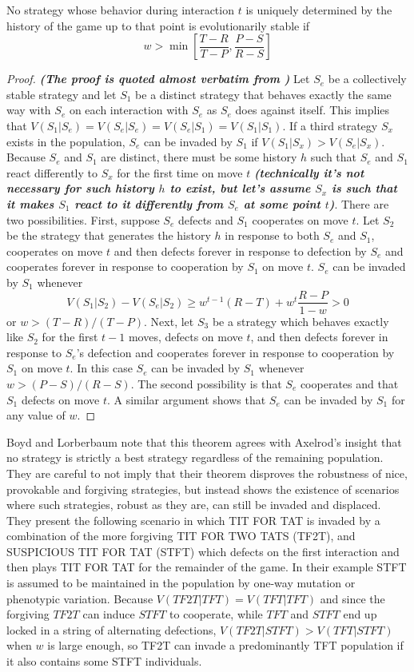 \begin{theorem}
No strategy whose behavior during interaction $t$ is uniquely determined by the history of the game up to that point is evolutionarily stable if
\[
w > \min \left[ \frac{T-R}{T-P}, \frac{P-S}{R-S} \right]
\]
\end{theorem}
\begin{proof}
\textit{\textbf{(The proof is quoted almost verbatim from \cite{Boyd_Lorberbaum_1987})}}
Let $S_e$ be a collectively stable strategy and let $S_1$ be a distinct strategy that behaves exactly the same way with $S_e$ on each interaction with $S_e$ as $S_e$ does against itself. This implies that $V(S_1 | S_e) = V (S_e | S_e) = V(S_e | S_1) = V(S_1 | S_1)$. If a third strategy $S_x$ exists in the population, $S_e$ can be invaded by $S_1$ if $V(S_1 | S_x) > V(S_e | S_x)$. Because $S_e$ and $S_1$ are distinct, there must be some history $h$ such that $S_e$ and $S_1$ react differently to $S_x$ for the first time on move $t$ \textit{\textbf{(technically it's not necessary for such history $h$ to exist, but let's assume $S_x$ is such that it makes $S_1$ react to it differently from $S_e$ at some point $t$)}}. There are two possibilities. First, suppose $S_e$ defects and $S_1$ cooperates on move $t$. Let $S_2$ be the strategy that generates the history $h$ in response to both $S_e$ and $S_1$, cooperates on move $t$ and then defects forever in response to defection by $S_e$ and cooperates forever in response to cooperation by $S_1$ on move $t$. $S_e$ can be invaded by $S_1$ whenever
\[
V(S_1 | S_2) - V(S_e | S_2) \geq w^{t-1} (R-T) + w^t \frac{R- P}{1-w} > 0
\]
or $w > (T-R) / (T-P)$. Next, let $S_3$ be a strategy which behaves exactly like $S_2$ for the first $t-1$ moves, defects on move $t$, and then defects forever in response to $S_e$'s defection and cooperates forever in response to cooperation by $S_1$ on move $t$. In this case $S_e$ can be invaded by $S_1$ whenever $w > (P-S) / (R-S)$. The second possibility is that $S_e$ cooperates and that $S_1$ defects on move $t$. A similar argument shows that $S_e$ can be invaded by $S_1$ for any value of $w$.
\end{proof}

Boyd and Lorberbaum note that this theorem agrees with Axelrod's insight that no strategy is strictly a best strategy regardless of the remaining population. They are careful to not imply that their theorem disproves the robustness of nice, provokable and forgiving strategies, but instead shows the existence of scenarios where such strategies, robust as they are, can still be invaded and displaced. They present the following scenario in which TIT FOR TAT is invaded by a combination of the more forgiving TIT FOR TWO TATS (TF2T), and SUSPICIOUS TIT FOR TAT (STFT) which defects on the first interaction and then plays TIT FOR TAT for the remainder of the game. In their example STFT is assumed to be maintained in the population by one-way mutation or phenotypic variation. Because $V(TF2T | TFT) = V(TFT | TFT)$ and since the forgiving $TF2T$ can induce $STFT$ to cooperate, while $TFT$ and $STFT$ end up locked in a string of alternating defections, $V(TF2T | STFT) > V(TFT | STFT)$ when $w$ is large enough, so TF2T can invade a predominantly TFT population if it also contains some STFT individuals.

